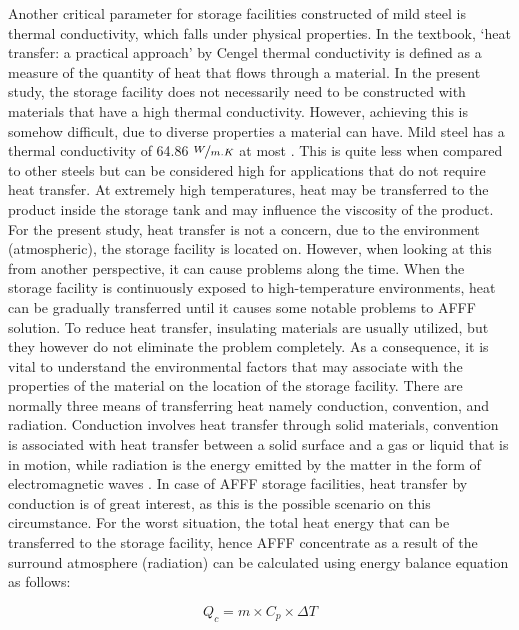 \documentclass[12pt]{report}
\begin{document}
Another critical parameter for storage facilities constructed of mild steel is thermal conductivity, which falls under physical properties. In the textbook, ‘heat transfer: a practical approach’ by Cengel \cite{cengel1998heat} thermal conductivity is defined as a measure of the quantity of heat that flows through a material. In the present study, the storage facility does not necessarily need to be constructed with materials that have a high thermal conductivity. However, achieving this is somehow difficult, due to diverse properties a material can have.
Mild steel has a thermal conductivity of 64.86 $\nicefrac{W}{m.K}$ at most \cite{cengel1998heat}. This is quite less when compared to other steels but can be considered high for applications that do not require heat transfer. At extremely high temperatures, heat may be transferred to the product inside the storage tank and may influence the viscosity of the product. For the present study, heat transfer is not a concern, due to the environment (atmospheric), the storage facility is located on. However, when looking at this from another perspective, it can cause problems along the time. When the storage facility is continuously exposed to high-temperature environments, heat can be gradually transferred until it causes some notable problems to AFFF solution. To reduce heat transfer, insulating materials are usually utilized, but they however do not eliminate the problem completely. As a consequence, it is vital to understand the environmental factors that may associate with the properties of the material on the location of the storage facility.
There are normally three means of transferring heat namely conduction, convention, and radiation. Conduction involves heat transfer through solid materials, convention is associated with heat transfer between a solid surface and a gas or liquid that is in motion, while radiation is the energy emitted by the matter in the form of electromagnetic waves \cite{cengel1998heat}. In case of AFFF storage facilities, heat transfer by conduction is of great interest, as this is the possible scenario on this circumstance.   
For the worst situation, the total heat energy that can be transferred to the storage facility, hence AFFF concentrate as a result of the surround atmosphere (radiation) can be calculated using energy balance equation as follows:

\begin{equation}
    Q_c = m \times C_p \times \Delta T
\end{equation}
\end{document}
